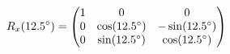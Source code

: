 \documentclass[preview]{standalone}
\begin{document}
\begin{align*}
\special{dvisvgm:raw <g id='unique000'>}R_x(12.5^\circ) = \begin{pmatrix} 1 & 0 & 0 \\ 0 & \cos(12.5^\circ) & -\sin(12.5^\circ) \\ 0 & \sin(12.5^\circ) & \cos(12.5^\circ) \end{pmatrix}\special{dvisvgm:raw </g>}
\end{align*}
\end{document}
